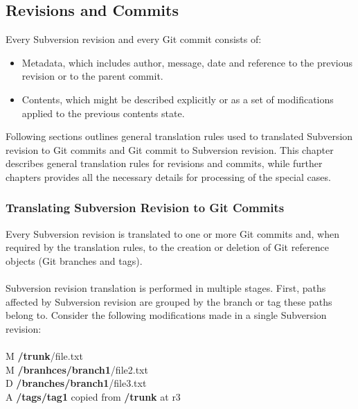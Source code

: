 \subsection{Revisions and Commits}
\renewcommand{\figurename}{Diagram}
Every Subversion revision and every Git commit consists of:
\begin{itemize}
\item Metadata, which includes author, message, date and reference to the previous revision or to the parent commit.
\item Contents, which might be described explicitly or as a set of modifications applied to the previous contents state.
\end{itemize}
Following sections outlines general translation rules used to translated Subversion revision to Git commits and Git commit
to Subversion revision. This chapter describes general translation rules for revisions and commits, while further chapters provides all the 
necessary details for processing of the special cases.
\subsubsection{Translating Subversion Revision to Git Commits}
Every Subversion revision is translated to one or more Git commits and,
when required by the translation rules, to the creation or deletion of Git reference objects (Git branches and tags).
\\\\
Subversion revision translation is performed in multiple stages.
First, paths affected by Subversion revision are grouped by the branch or tag these paths belong to. 
Consider the following modifications made in a single Subversion revision:
\\\\
M \textbf{/trunk}/file.txt\\
M \textbf{/branhces/branch1}/file2.txt\\
D \textbf{/branches/branch1}/file3.txt\\
A \textbf{/tags/tag1} copied from \textbf{/trunk} at r3\\

